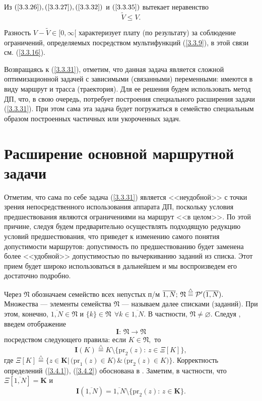 \documentclass[11pt,twoside,openany]{report}
\newcommand{\bfn}{\begin{equation}}
\newcommand{\efn}{\end{equation}}
\newcommand{\df}{\stackrel{\triangle}{=}}
\newcommand{\ov}{\overline}
\newcommand{\sm}{\setminus}
\newcommand{\fa}{\forall}
\newcommand{\cp}{{\cal P}}
\newcommand{\emp}{\varnothing}
\begin{document}
Из $(\ref{3.3.26}), (\ref{3.3.27}), (\ref{3.3.32})$ и $(\ref{3.3.35})$
вытекает неравенство
\bfn
  \label{3.3.38}
  \widetilde{V} \leqslant V.
\efn

Разность $V -\widetilde{V}\in [0,\infty[$
характеризует плату
(по результату)
за соблюдение ограничений, определяемых посредством мультифункций (\ref{3.3.9}),
в этой связи см. (\ref{3.3.16}).

Возвращаясь к (\ref{3.3.31}),
отметим, что данная задача является сложной
оптимизационной задачей с зависимыми (связанными) переменными:
имеются в виду
маршрут и трасса (траектория).
Для ее решения будем использовать метод ДП, что,
в свою очередь,
потребует построения специального расширения задачи (\ref{3.3.31}).
При этом сама эта задача будет погружаться в семейство специальным образом
построенных частичных или укороченных задач.

{\raggedright\section{
  Расширение основной маршрутной задачи
}}
\label{sect:3.4}
\setcounter{equation}{0}

Отметим, что сама по себе задача (\ref{3.3.31})
является <<неудобной>> с точки
зрения непосредственного использования аппарата ДП,
поскольку условия предшествования
являются ограничениями на маршрут <<в целом>>.
По этой причине, следуя \cite{Cha1`,Cha2`,Cha3`}
будем предварительно осуществлять подходящую редукцию условий предшествования,
что приведет к изменению самого понятия допустимости маршрутов:
допустимость по предшествованию будет
заменена более <<удобной>> допустимостью по вычеркиванию
заданий из списка.
Этот прием будет широко использоваться в дальнейшем
и мы воспроизведем его достаточно подробно.

Через $\mathfrak{N}$ обозначаем семейство всех непустых п/м
$\ov{1,N};\,\mathfrak{N}\df \cp^\prime(\ov{1,N}).$
Множества --- элементы семейства $\mathfrak{N}$ --- называем далее
списками (заданий).
При этом,  конечно,
$\ov{1,N}\in \mathfrak{N}$ и $\{k\}\in \mathfrak{N}\ \ \fa k\in \ov{1,N}.$
В частности, $\mathfrak{N}\neq \emp.$
Следуя
\cite[ч.~2]{Cha11`},
введем отображение
\bfn
  \label{3.4.1}
  \mathbf{I}:\, \mathfrak{N}\longrightarrow\mathfrak{N}
\efn
посредством следующего правила:
если $K\in \mathfrak{N},$ то
\bfn
  \label{3.4.2}
  \mathbf{I}(K) \df K\sm\{\mathrm{pr}_2(z):\,z\in \Xi[K]\}
  ,
\efn
где
$\Xi[K] \df \{z\in \mathbf{K}|\,\bigl(\mathrm{pr}_1(z)\in K\bigl)\,\&\,
\bigl(\mathrm{pr}_2(z)\in K\bigl)\}$.
Корректность определений (\ref{3.4.1}),
(\ref{3.4.2}) обоснована в \cite[ч.~2]{Cha1`}.
Заметим, в частности, что
$\Xi[\ov{1,N}] = \mathbf{K}$ и
\bfn
  \label{3.4.3}
  \mathbf{I}(\ov{1,N}) = \ov{1,N}\sm \{\mathrm{pr}_2(z):\,z\in \mathbf{K}\}
  .
\efn
\end{document}
